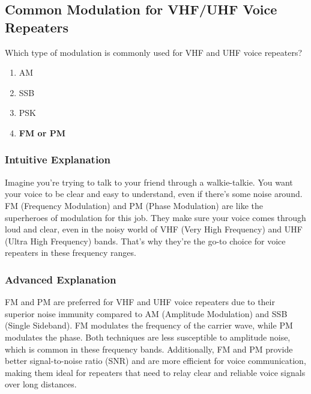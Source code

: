 \subsection{Common Modulation for VHF/UHF Voice Repeaters}
\label{T8A04}

\begin{tcolorbox}[colback=gray!10!white,colframe=black!75!black,title=T8A04]
Which type of modulation is commonly used for VHF and UHF voice repeaters?
\begin{enumerate}[noitemsep]
    \item AM
    \item SSB
    \item PSK
    \item \textbf{FM or PM}
\end{enumerate}
\end{tcolorbox}

\subsubsection*{Intuitive Explanation}
Imagine you're trying to talk to your friend through a walkie-talkie. You want your voice to be clear and easy to understand, even if there's some noise around. FM (Frequency Modulation) and PM (Phase Modulation) are like the superheroes of modulation for this job. They make sure your voice comes through loud and clear, even in the noisy world of VHF (Very High Frequency) and UHF (Ultra High Frequency) bands. That's why they're the go-to choice for voice repeaters in these frequency ranges.

\subsubsection*{Advanced Explanation}
FM and PM are preferred for VHF and UHF voice repeaters due to their superior noise immunity compared to AM (Amplitude Modulation) and SSB (Single Sideband). FM modulates the frequency of the carrier wave, while PM modulates the phase. Both techniques are less susceptible to amplitude noise, which is common in these frequency bands. Additionally, FM and PM provide better signal-to-noise ratio (SNR) and are more efficient for voice communication, making them ideal for repeaters that need to relay clear and reliable voice signals over long distances.